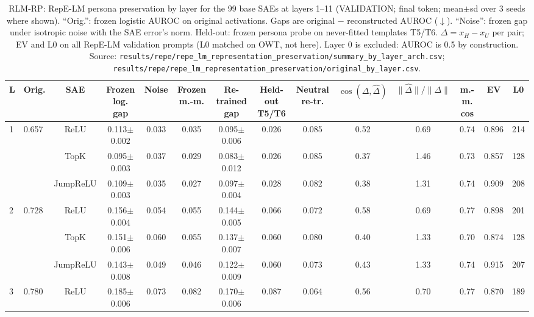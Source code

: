 \begin{table}[t]
\centering
\small
\caption{RLM-RP: RepE-LM persona preservation by layer for the 99 base SAEs at layers 1--11 (VALIDATION; final token; mean$\pm$sd over 3 seeds where shown). ``Orig.'': frozen logistic AUROC on original activations. Gaps are original $-$ reconstructed AUROC ($\downarrow$). ``Noise'': frozen gap under isotropic noise with the SAE error's norm. Held-out: frozen persona probe on never-fitted templates T5/T6. $\Delta=x_H-x_U$ per pair; EV and L0 on all RepE-LM validation prompts (L0 matched on OWT, not here). Layer 0 is excluded: AUROC is 0.5 by construction. Source: \texttt{results/\allowbreak{}repe/\allowbreak{}repe\_lm\_representation\_preservation/\allowbreak{}summary\_by\_layer\_arch.csv}; \texttt{results/\allowbreak{}repe/\allowbreak{}repe\_lm\_representation\_preservation/\allowbreak{}original\_by\_layer.csv}.}
\label{tab:rlm_layers}
\begin{adjustbox}{max width=\linewidth}
\begin{tabular}{llcccccccccccc}
\toprule
L & Orig. & SAE & Frozen log. gap & Noise & Frozen m.-m. & Re-trained gap & Held-out T5/T6 & Neutral re-tr. & $\cos(\Delta,\hat\Delta)$ & $\|\hat\Delta\|/\|\Delta\|$ & m.-m. cos & EV & L0 \\
\midrule
1 & 0.657 & ReLU & 0.113$\pm$0.002 & 0.033 & 0.035 & 0.095$\pm$0.006 & 0.026 & 0.085 & 0.52 & 0.69 & 0.74 & 0.896 & 214 \\
 &  & TopK & 0.095$\pm$0.003 & 0.037 & 0.029 & 0.083$\pm$0.012 & 0.026 & 0.085 & 0.37 & 1.46 & 0.73 & 0.857 & 128 \\
 &  & JumpReLU & 0.109$\pm$0.003 & 0.035 & 0.027 & 0.097$\pm$0.004 & 0.028 & 0.082 & 0.38 & 1.31 & 0.74 & 0.909 & 208 \\
\midrule
2 & 0.728 & ReLU & 0.156$\pm$0.004 & 0.054 & 0.055 & 0.144$\pm$0.005 & 0.066 & 0.072 & 0.58 & 0.69 & 0.77 & 0.898 & 201 \\
 &  & TopK & 0.151$\pm$0.006 & 0.060 & 0.055 & 0.137$\pm$0.007 & 0.060 & 0.080 & 0.40 & 1.33 & 0.70 & 0.874 & 128 \\
 &  & JumpReLU & 0.143$\pm$0.008 & 0.049 & 0.046 & 0.122$\pm$0.009 & 0.060 & 0.073 & 0.43 & 1.33 & 0.74 & 0.915 & 207 \\
\midrule
3 & 0.780 & ReLU & 0.185$\pm$0.006 & 0.073 & 0.082 & 0.170$\pm$0.006 & 0.087 & 0.064 & 0.56 & 0.70 & 0.77 & 0.870 & 189 \\

\end{tabular}
\end{adjustbox}
\end{table}
